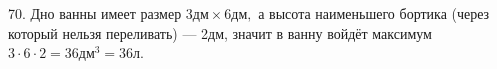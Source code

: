 70. Дно ванны имеет размер $3\text{дм}\times6\text{дм},$ а высота наименьшего бортика (через который нельзя переливать) --- 2дм, значит в ванну войдёт максимум $3\cdot6\cdot2=36\text{дм}^3=36$л.\\
